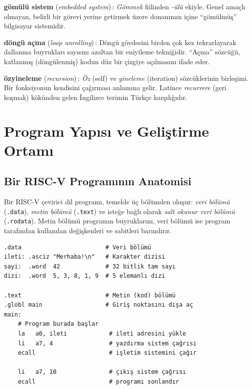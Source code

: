 \begin{terimnotu}
\textbf{gömülü sistem} (\emph{embedded system})\,: \emph{Gömmek} fiilinden \emph{-ülü} ekiyle. Genel amaçlı olmayan, belirli bir görevi yerine getirmek üzere donanımın içine ``gömülmüş'' bilgisayar sistemidir.

\textbf{döngü açma} (\emph{loop unrolling})\,: Döngü gövdesini birden çok kez tekrarlayarak dallanma buyrukları sayısını azaltan bir eniyileme tekniğidir. ``Açma'' sözcüğü, katlanmış (döngülenmiş) kodun düz bir çizgiye açılmasını ifade eder.

\textbf{özyineleme} (\emph{recursion})\,: \emph{Öz} (self) ve \emph{yineleme} (iteration) sözcüklerinin birleşimi. Bir fonksiyonun kendisini çağırması anlamına gelir. Latince \emph{recurrere} (geri koşmak) kökünden gelen İngilizce terimin Türkçe karşılığıdır.
\end{terimnotu}


\section{Program Yapısı ve Geliştirme Ortamı}
\label{sec:program-yapisi}

\subsection{Bir RISC-V Programının Anatomisi}
\label{subsec:program-anatomisi}

Bir RISC-V çevirici dil programı, temelde üç bölümden oluşur: \emph{veri bölümü} (\texttt{.data}), \emph{metin bölümü} (\texttt{.text}) ve isteğe bağlı olarak \emph{salt okunur veri bölümü} (\texttt{.rodata}). Metin bölümü programın buyruklarını, veri bölümü ise program tarafından kullanılan değişkenleri ve sabitleri barındırır.

\begin{lstlisting}[style=riscv]
.data                        # Veri bölümü
ileti: .asciz "Merhaba!\n"   # Karakter dizisi
sayi:  .word  42             # 32 bitlik tam sayı
dizi:  .word  5, 3, 8, 1, 9  # 5 elemanlı dizi

.text                        # Metin (kod) bölümü
.globl main                  # Giriş noktasını dışa aç
main:
    # Program burada başlar
    la   a0, ileti            # ileti adresini yükle
    li   a7, 4                # yazdırma sistem çağrısı
    ecall                     # işletim sistemini çağır

    li   a7, 10               # çıkış sistem çağrısı
    ecall                     # programı sonlandır
\end{lstlisting}

